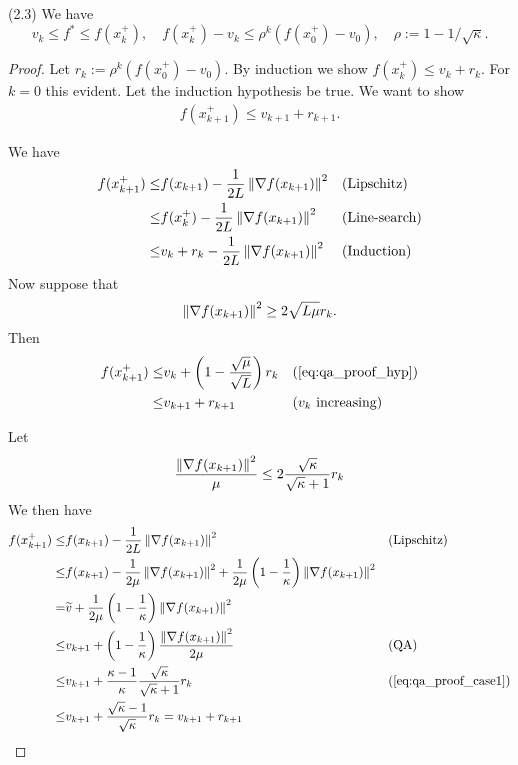 \documentclass[12pt,english]{article}
\begin{document}
\begin{theorem}(2.3)\label{thm:}
We have
%
\begin{equation}\label{eq:}
v_k \le f^* \le f(x_k^+),\quad f(x_k^+)-v_k \le \rho^k \left(f(x_0^+)-v_0\right), \quad \rho:=1-1/\sqrt{\kappa}.
\end{equation}
%
\end{theorem}
%
\begin{proof}
Let $r_k := \rho^k \left(f(x_0^+)-v_0\right)$. By induction we show $ f(x_k^+)\le v_k+r_k$. For $k=0$ this evident. Let the induction hypothesis be true. We want to show
%
\begin{align*}
f(x_{k+1}^+) \le v_{k+1} + r_{k+1}.
\end{align*}
%

%
\begin{grayenv}
%
We have
%
\begin{align*}
f(x_{k+1}^+) \le& f(x_{k+1}) - \frac{1}{2L}\left\|\nabla f(x_{k+1})\right\|^2&& \mbox{(Lipschitz)}\\
\le& f(x_{k}^+) - \frac{1}{2L}\left\|\nabla f(x_{k+1})\right\|^2&& \mbox{(Line-search)}\\
\le& v_k + r_k - \frac{1}{2L}\left\|\nabla f(x_{k+1})\right\|^2&& \mbox{(Induction)}\\
\end{align*}
%
Now suppose that
%
\begin{equation}\label{eq:qa_proof_hyp}
\left\|\nabla f(x_{k+1})\right\|^2 \ge 2 \sqrt{L\mu}r_k.
\end{equation}
%
Then
%
\begin{align*}
f(x_{k+1}^+) \le& v_k + \left(1-\frac{\sqrt{\mu}}{\sqrt{L}}\right)r_k&& \mbox{(\ref{eq:qa_proof_hyp})}\\
\le& v_{k+1} + r_{k+1}&& \mbox{($v_k$ increasing)}
\end{align*}
%

%
\end{grayenv}
%
Let
%
\begin{equation}\label{eq:qa_proof_case1}
\frac{\left\|\nabla f(x_{k+1})\right\|^2}{\mu} \le  2\frac{\sqrt{\kappa}}{\sqrt{\kappa}+1}r_k
\end{equation}
%
%
We then have
%
\begin{align*}
f(x_{k+1}^+) \le& f(x_{k+1}) - \frac{1}{2L}\left\|\nabla f(x_{k+1})\right\|^2&& \mbox{(Lipschitz)}\\
\le& f(x_{k+1}) - \frac{1}{2\mu}\left\|\nabla f(x_{k+1})\right\|^2 + \frac{1}{2\mu}\left(1-\frac{1}{\kappa}\right)\left\|\nabla f(x_{k+1})\right\|^2 && \mbox{}\\
=& \widetilde{v}  + \frac{1}{2\mu}\left(1-\frac{1}{\kappa}\right)\left\|\nabla f(x_{k+1})\right\|^2&& \mbox{}\\
\le& v_{k+1}  + \left(1-\frac{1}{\kappa}\right)\frac{\left\|\nabla f(x_{k+1})\right\|^2}{2\mu}&& \mbox{(QA)}\\
\le& v_{k+1}  + \frac{\kappa-1}{\kappa}\frac{\sqrt{\kappa}}{\sqrt{\kappa}+1}r_k&& \mbox{(\ref{eq:qa_proof_case1})}\\
\le& v_{k+1}  + \frac{\sqrt{\kappa}-1}{\sqrt{\kappa}}r_k= v_{k+1}  + r_{k+1}&&
\end{align*}
%
%


\end{proof}
\end{document}
